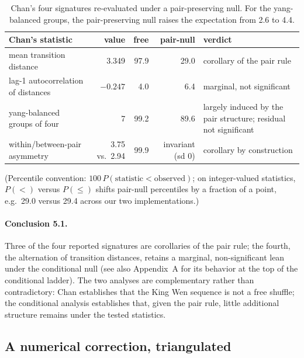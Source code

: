 \documentclass[11pt]{article}
\begin{document}
\begin{table}[t]
\centering
\caption{Chan's four signatures re-evaluated under a pair-preserving null. For the yang-balanced groups, the pair-preserving null raises the expectation from 2.6 to 4.4.}
\label{tab:chan}
\small
\begin{tabular}{@{}lrrr>{\raggedright\arraybackslash}p{3.1cm}@{}}
\toprule
Chan's statistic & value & free & pair-null & verdict \\
\midrule
mean transition distance           & 3.349          & 97.9 & 29.0             & corollary of the pair rule \\
\addlinespace
lag-1 autocorrelation of distances & $-0.247$       & 4.0  & 6.4              & marginal, not significant \\
\addlinespace
yang-balanced groups of four       & 7              & 99.2 & 89.6             & largely induced by the pair structure; residual not significant \\
\addlinespace
within/between-pair asymmetry      & 3.75 vs.\ 2.94 & 99.9 & invariant (sd 0) & corollary by construction \\
\bottomrule
\end{tabular}
\end{table}

(Percentile convention: $100\,P(\text{statistic} < \text{observed})$; on integer-valued statistics, $P(<)$ versus $P(\le)$ shifts pair-null percentiles by a fraction of a point, e.g.\ 29.0 versus 29.4 across our two implementations.)

\paragraph{Conclusion 5.1.} Three of the four reported signatures are corollaries of the pair rule; the fourth, the alternation of transition distances, retains a marginal, non-significant lean under the conditional null (see also Appendix~A for its behavior at the top of the conditional ladder). The two analyses are complementary rather than contradictory: Chan establishes that the King Wen sequence is not a free shuffle; the conditional analysis establishes that, given the pair rule, little additional structure remains under the tested statistics.

\subsection{A numerical correction, triangulated}
\end{document}
